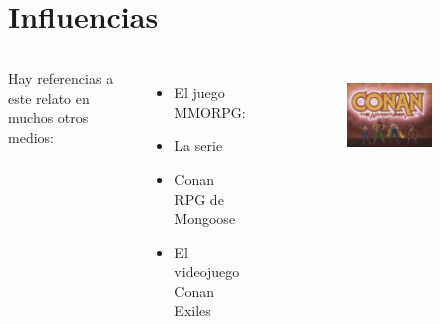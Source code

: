 \section{Influencias}
\begin{frame}{}
 \begin{columns}
 Hay referencias a este relato en muchos otros medios:
\begin{itemize}
 \item El juego MMORPG: 
 \item La serie 
 \item Conan RPG de Mongoose
 \item El videojuego Conan Exiles
\end{itemize}
\begin{figure}[htp]
 \centering
 \begin{subfigure}[b]{0.3\textwidth}
   \includegraphics[width=\textwidth]{img/otros/Conantheadventurerlogo}
 \end{subfigure}
~
 \begin{subfigure}[b]{0.3\textwidth}

\end{subfigure}
\end{figure}
\end{columns}
\end{frame}

